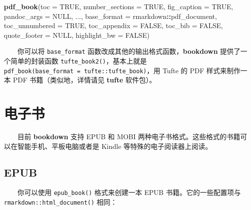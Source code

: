 \documentclass[
  12pt,
]{krantz}
\newenvironment{Shaded}{\begin{snugshade}}{\end{snugshade}}
\newcommand{\AttributeTok}[1]{\textcolor[rgb]{0.13,0.29,0.53}{#1}}
\newcommand{\ConstantTok}[1]{\textcolor[rgb]{0.56,0.35,0.01}{#1}}
\newcommand{\FunctionTok}[1]{\textcolor[rgb]{0.13,0.29,0.53}{\textbf{#1}}}
\newcommand{\NormalTok}[1]{#1}
\newcommand{\SpecialCharTok}[1]{\textcolor[rgb]{0.81,0.36,0.00}{\textbf{#1}}}
\theoremstyle{definition}
\theoremstyle{definition}
\theoremstyle{definition}
\theoremstyle{definition}
\theoremstyle{remark}
\begin{document}
\begin{Shaded}
\begin{Highlighting}[]
\FunctionTok{pdf\_book}\NormalTok{(}\AttributeTok{toc =} \ConstantTok{TRUE}\NormalTok{, }\AttributeTok{number\_sections =} \ConstantTok{TRUE}\NormalTok{,}
  \AttributeTok{fig\_caption =} \ConstantTok{TRUE}\NormalTok{, }\AttributeTok{pandoc\_args =} \ConstantTok{NULL}\NormalTok{, ...,}
  \AttributeTok{base\_format =}\NormalTok{ rmarkdown}\SpecialCharTok{::}\NormalTok{pdf\_document,}
  \AttributeTok{toc\_unnumbered =} \ConstantTok{TRUE}\NormalTok{, }\AttributeTok{toc\_appendix =} \ConstantTok{FALSE}\NormalTok{,}
  \AttributeTok{toc\_bib =} \ConstantTok{FALSE}\NormalTok{, }\AttributeTok{quote\_footer =} \ConstantTok{NULL}\NormalTok{,}
  \AttributeTok{highlight\_bw =} \ConstantTok{FALSE}\NormalTok{)}
\end{Highlighting}
\end{Shaded}

  你可以将 \texttt{base\_format} 函数改成其他的输出格式函数，\textbf{bookdown} 提供了一个简单的封装函数 \texttt{tufte\_book2()}，基本上就是 \texttt{pdf\_book(base\_format\ =\ tufte::tufte\_book)}，用 Tufte 的 PDF 样式来制作一本 PDF 书籍（类似地，详情请见 \textbf{tufte} 软件包）。

\hypertarget{ux7535ux5b50ux4e66}{%
\section{电子书}\label{ux7535ux5b50ux4e66}}

  目前 \textbf{bookdown} 支持 EPUB 和 MOBI 两种电子书格式。这些格式的书籍可以在智能手机、平板电脑或者是 Kindle 等特殊的电子阅读器上阅读。

\hypertarget{epub}{%
\subsection{EPUB}\label{epub}}

  你可以使用 \texttt{epub\_book()} 格式来创建一本 EPUB 书籍。它的一些配置项与 \texttt{rmarkdown::html\_document()} 相同：
\end{document}
